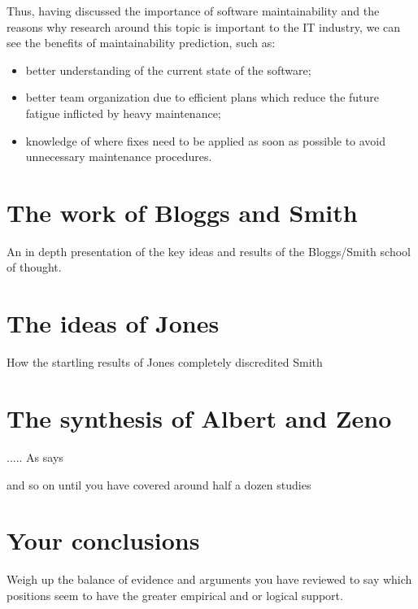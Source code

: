 \documentclass[a4paper,portrait,12pt]{article}
\begin{document}
  Thus, having discussed the importance of software maintainability and the
  reasons why research around this topic is important to the IT industry,
  we can see the benefits of maintainability prediction, such as:
    \begin{itemize}
      \item better understanding of the current state of the software;
      \item better team organization due to efficient plans which reduce
      the future fatigue inflicted by heavy maintenance;
      \item knowledge of where fixes need to be applied as soon as possible
      to avoid unnecessary maintenance procedures.
    \end{itemize}

 \section{The work of Bloggs and Smith}
 
  An in depth presentation of the key ideas and results of the Bloggs/Smith
  school of thought\citep{SYMBOL}. 
 \section{The ideas of Jones}
 
 How the startling results of Jones\citep{Hayes89} completely discredited Smith
 
 \section{The synthesis of  Albert and Zeno}
 ..... As \citet{Einstein} says
 
 and so on until you have covered around half a dozen studies
 \section{Your conclusions}

Weigh up the balance of evidence and arguments you have reviewed to say which
positions seem to have the greater empirical and or logical support.



\end{document}
